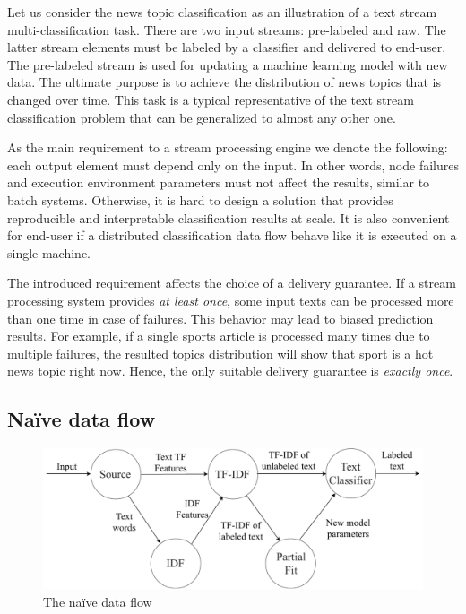 \label{fs-framework}

Let us consider the news topic classification as an illustration of a text stream multi-classification task. There are two input streams: pre-labeled and raw. The latter stream elements must be labeled by a classifier and delivered to end-user. The pre-labeled stream is used for updating a machine learning model with new data. The ultimate purpose is to achieve the distribution of news topics that is changed over time. This task is a typical representative of the text stream classification problem that can be generalized to almost any other one.

As the main requirement to a stream processing engine we denote the following: each output element must depend only on the input. In other words, node failures and execution environment parameters must not affect the results, similar to batch systems. Otherwise, it is hard to design a solution that provides reproducible and interpretable classification results at scale. It is also convenient for end-user if a distributed classification data flow behave like it is executed on a single machine.

The introduced requirement affects the choice of a delivery guarantee. If a stream processing system provides {\em at least once}, some input texts can be processed more than one time in case of failures. This behavior may lead to biased prediction results. For example, if a single sports article is processed many times due to multiple failures, the resulted topics distribution will show that sport is a hot news topic right now. Hence, the only suitable delivery guarantee is {\em exactly once}.

\subsection{Na\"ive data flow}

\begin{figure}[htbp]
  \centering
  \includegraphics[scale=0.38]{pics/logical-graph}
  \caption{The na\"ive data flow}
  \label {logical_graph}
\end{figure}

